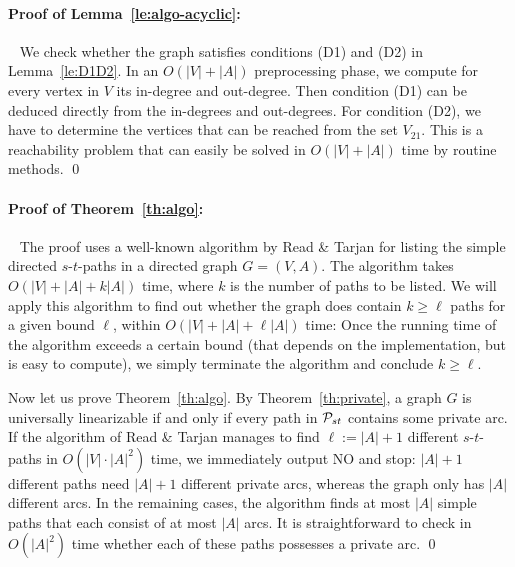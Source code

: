 \documentclass[runningheads]{llncs}
\begin{document}
\begin{appendix}
\paragraph*{\bf Proof of Lemma~\ref{le:algo-acyclic}:}~
We check whether the graph satisfies conditions (D1) and (D2) in Lemma~\ref{le:D1D2}.
In an $O(|V|+|A|)$ preprocessing phase, we compute for every vertex in $V$ its in-degree and out-degree.
Then condition (D1) can be deduced directly from the in-degrees and out-degrees.
For condition (D2), we have to determine the vertices that can be reached from the set $V_{21}$.
This is a reachability problem that can easily be solved in $O(|V|+|A|)$ time by routine methods.
\qed

\paragraph*{\bf Proof of Theorem~\ref{th:algo}:}~
The proof uses a well-known algorithm by Read \& Tarjan \cite{ReTa1975} for listing the 
simple directed $s$-$t$-paths in a directed graph $G=(V,A)$.
The algorithm takes $O(|V|+|A|+k|A|)$ time, where $k$ is the number of paths to be listed.
We will apply this algorithm to find out whether the graph does contain $k\ge\ell$ paths for
a given bound $\ell$, within $O(|V|+|A|+\ell|A|)$ time:
Once the running time of the algorithm exceeds a certain bound (that depends on the implementation,
but is easy to compute), we simply terminate the algorithm and conclude $k\ge\ell$.

Now let us prove Theorem~\ref{th:algo}.
By Theorem~\ref{th:private}, a graph $G$ is universally linearizable if and only if
every path in ${\cal P}_{st}$ contains some private arc.
If the algorithm of Read \& Tarjan \cite{ReTa1975} manages to find $\ell:=|A|+1$ different
$s$-$t$-paths in $O(|V|\cdot|A|^2)$ time, we immediately output NO and stop: $|A|+1$ different
paths need $|A|+1$ different private arcs, whereas the graph only has $|A|$ different arcs.
In the remaining cases, the algorithm finds at most $|A|$ simple paths that each consist of at most $|A|$ arcs.
It is straightforward to check in $O(|A|^2)$ time whether each of these paths possesses
a private arc.
\qed



\end{appendix}
\end{document}
